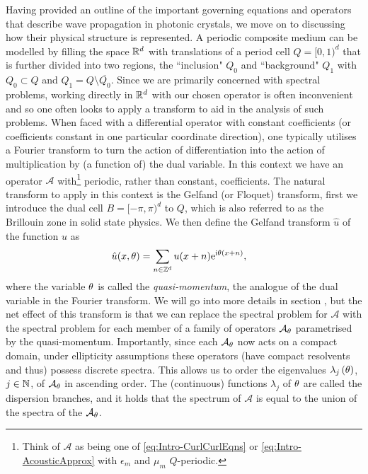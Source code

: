 Having provided an outline of the important governing equations and operators that describe wave propagation in photonic crystals, we move on to discussing how their physical structure is represented.
A periodic composite medium can be modelled by filling the space $\mathbb{R}^d$ with translations of a period cell $Q=[0,1)^d$ that is further divided into two regions, the ``inclusion" $Q_0$ and ``background" $Q_1$ with $Q_0\subset Q$ and $Q_1=Q\setminus\overline{Q_0}$.
Since we are primarily concerned with spectral problems, working directly in $\mathbb{R}^d$ with our chosen operator is often inconvenient  and so one often looks to apply a transform to aid in the analysis of such problems.
When faced with a differential operator with constant coefficients (or coefficients constant in one particular coordinate direction), one typically utilises a Fourier transform to turn the action of differentiation into the action of multiplication by (a function of) the dual variable.
In this context we have an operator $\mathcal{A}$ with\footnote{Think of $\mathcal{A}$ as being one of \eqref{eq:Intro-CurlCurlEqns} or \eqref{eq:Intro-AcousticApprox} with $\epsilon_m$ and $\mu_m$ $Q$-periodic.} periodic, rather than constant, coefficients.
The natural transform to apply in this context is the Gelfand (or Floquet) transform, first we introduce the dual cell $B=[-\pi,\pi)^d$ to $Q$, which is also referred to as the Brillouin zone in solid state physics.
We then define the Gelfand transform $\hat{u}$ of the function $u$ as 
\begin{align*}
	\hat{u}(x, \theta) &= \sum_{n\in\mathbb{Z}^d} u(x+n)\mathrm{e}^{\mathrm{i}\theta(x+n)},
\end{align*}
where the variable $\theta$ is called the \emph{quasi-momentum}, the analogue of the dual variable in the Fourier transform.
We will go into more details in section , but the net effect of this transform is that we can replace the spectral problem for $\mathcal{A}$ with the spectral problem for each member of a family of operators $\mathcal{A}_{\theta}$ parametrised by the quasi-momentum.
Importantly, since each $\mathcal{A}_{\theta}$ now acts on a compact domain, under ellipticity assumptions these operators (have compact resolvents and thus) possess discrete spectra.
This allows us to order the eigenvalues $\lambda_j\left( \theta \right)$, $j\in\mathbb{N}$, of $\mathcal{A}_{\theta}$ in ascending order.
The (continuous) functions $\lambda_j$ of $\theta$ are called the dispersion branches, and it holds that the spectrum of $\mathcal{A}$ is equal to the union of the spectra of the $\mathcal{A}_\theta$.

